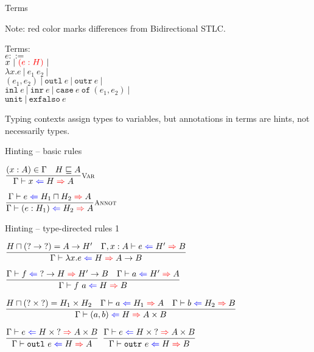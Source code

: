 \documentclass{beamer}
\newcommand{\pipe}{\ |\ }
\newcommand{\Fun}[2]{#1 \to #2}
\newcommand{\Prod}[2]{#1 \times #2}
\newcommand{\annot}[2]{(#1 : #2)}
\newcommand{\fun}[2]{\lambda #1. #2}
\newcommand{\app}[2]{#1\ #2}
\newcommand{\pair}[2]{(#1, #2)}
\newcommand{\outl}[1][]{\texttt{outl}\ #1}
\newcommand{\outr}[1][]{\texttt{outr}\ #1}
\newcommand{\inl}[1][]{\texttt{inl}\ #1}
\newcommand{\inr}[1][]{\texttt{inr}\ #1}
\newcommand{\case}[3]{\texttt{case}\ #1\ \texttt{of}\ (#2, #3)}
\newcommand{\unit}{\texttt{unit}}
\newcommand{\exfalso}[1][]{\texttt{exfalso}\ #1}
\newcommand{\infrule}[3][]{\displaystyle \frac{#2}{#3} \textsc{\footnotesize{#1}}}
\newcommand{\extend}[3]{#1, #2 : #3}
\newcommand{\sidecond}[1]{#1}
\begin{document}
\begin{frame}{Terms}

Note: red color marks differences from Bidirectional STLC.

\vspace{2em}

Terms: \\
$e ::=$ \\
\qquad $x \pipe \termdiff{\annot{e}{H}} \pipe $ \\
\qquad $\fun{x}{e} \pipe \app{e_1}{e_2} \pipe$ \\
\qquad $\pair{e_1}{e_2} \pipe \outl[e] \pipe \outr[e] \pipe$ \\
\qquad $\inl[e] \pipe \inr[e] \pipe \case{e}{e_1}{e_2} \pipe$ \\
\qquad $\unit \pipe \exfalso{e}$

\vspace{2em}

Typing contexts assign types to variables, but annotations in terms are hints, not necessarily types.

\end{frame}

\begin{frame}{Hinting -- basic rules}

\begin{center}
  $\infrule[Var]{\sidecond{(x : A) \in \Gamma} \quad \sidecond{\hintorder{H}{A}}}{\hinting{x}{H}{A}}$

  \vspace{2em}

  $\infrule[Annot]{\hinting{e}{\combinehints{H_1}{H_2}}{A}}{\hinting{\annot{e}{H_1}}{H_2}{A}}$
\end{center}

\end{frame}

\begin{frame}{Hinting -- type-directed rules 1}

\begin{center}
  $\infrule{\sidecond{\combinehints{H}{(\Fun{\Hint}{\Hint})} = \Fun{A}{H'}} \quad \fullhinting{\extend{\Gamma}{x}{A}}{e}{H'}{B}}{\hinting{\fun{x}{e}}{H}{\Fun{A}{B}}}$

  \vspace{1em}

  $\infrule{\hinting{f}{\Fun{\Hint}{H}}{\Fun{H'}{B}} \quad \hinting{a}{H'}{A}}{\hinting{\app{f}{a}}{H}{B}}$

  \vspace{1em}

  $\infrule{\sidecond{\combinehints{H}{(\Prod{\Hint}{\Hint})} = \Prod{H_1}{H_2}} \quad \hinting{a}{H_1}{A} \quad \hinting{b}{H_2}{B}}{\hinting{\pair{a}{b}}{H}{\Prod{A}{B}}}$

  \vspace{1em}

  $\infrule{\hinting{e}{\Prod{H}{\Hint}}{\Prod{A}{B}}}{\hinting{\outl[e]}{H}{A}}$ \quad
  $\infrule{\hinting{e}{\Prod{H}{\Hint}}{\Prod{A}{B}}}{\hinting{\outr[e]}{H}{B}}$
\end{center}

\end{frame}
\end{document}
